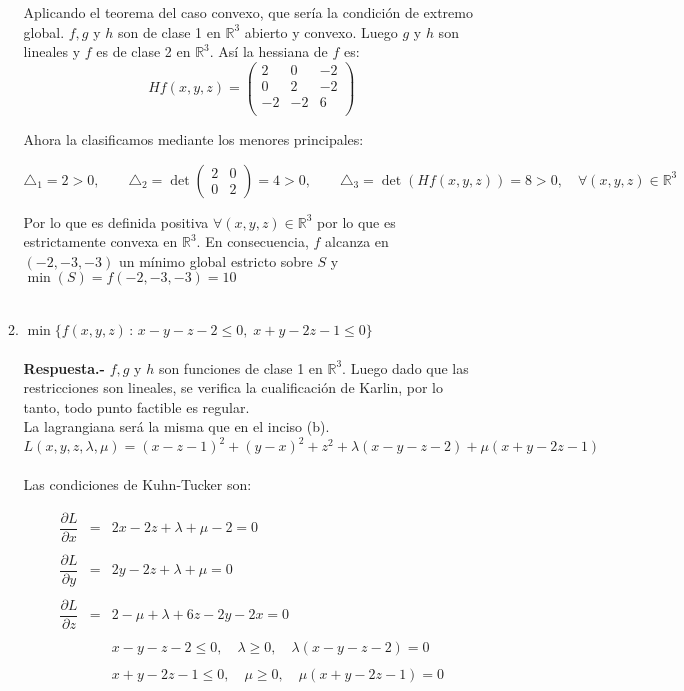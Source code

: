 \begin{enumerate}
\begin{enumerate}[\bfseries a)]
		Aplicando el teorema del caso convexo, que sería la condición de extremo global. $f,g$ y $h$ son de clase 1 en $\mathbb{R}^3$ abierto y convexo. Luego $g$ y $h$ son lineales y $f$ es de clase 2 en $\mathbb{R}^3$. Así la hessiana de $f$ es:
		$$Hf(x,y,z)=\begin{pmatrix}
		    2&0&-2\\
		    0&2&-2\\
		    -2&-2&6\\
		\end{pmatrix}$$

		Ahora la clasificamos mediante los menores principales:

		$$\triangle_1 = 2>0,\qquad \triangle_2 = \det \begin{pmatrix}2&0\\0&2\end{pmatrix} = 4>0,\qquad \triangle_3=\det(Hf(x,y,z))=8>0, \quad \forall (x,y,z)\in \mathbb{R}^3$$

		Por lo que es definida positiva $\forall(x,y,z)\in \mathbb{R}^3$ por lo que es estrictamente convexa en $\mathbb{R}^3$. En consecuencia, $f$ alcanza en $\left(-2,-3,-3\right)$ un mínimo global estricto sobre $S$ y $\min(S)=f\left(-2,-3,-3\right)=10$\\\\


	    \item $\min \lbrace f(x,y,z) \, : \, x-y-z-2\leq 0,\; x+y-2z-1\leq 0 \rbrace$\\\\	
		\textbf{Respuesta.-}\; $f,g$ y $h$ son funciones de clase 1 en $\mathbb{R}^3$. Luego dado que las restricciones son lineales, se verifica la cualificación de Karlin, por lo tanto, todo punto factible es regular.\\

		La lagrangiana será la misma que en el inciso (b).
		$$L(x,y,z,\lambda,\mu) = (x-z-1)^2+(y-x)^2 + z^2 + \lambda(x-y-z-2)+\mu(x+y-2z-1)$$\\

		Las condiciones de Kuhn-Tucker son:

		$$\begin{array}{rcl}
		    \dfrac{\partial L}{\partial x}&=&2x-2z+\lambda + \mu -2 = 0\\\\
		    \dfrac{\partial L}{\partial y}&=&2y-2z+\lambda + \mu = 0\\\\
		    \dfrac{\partial L}{\partial z}&=&2-\mu + \lambda +6z-2y-2x=0\\\\
						  &&x-y-z-2\leq0,\quad \lambda\geq 0,\quad \lambda(x-y-z-2)=0\\\\
						  &&x+y-2z-1\leq 0, \quad \mu\geq 0,\quad \mu(x+y-2z-1)=0\\\\
		\end{array}$$


\end{enumerate}
\end{enumerate}
